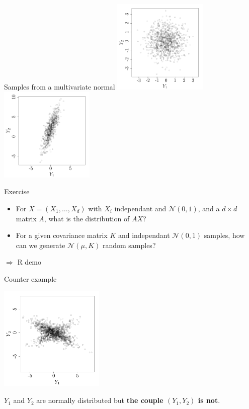 \begin{frame}{}
\begin{exampleblock}{Samples from a multivariate normal}
 \includegraphics[height=4.5cm]{1_stat_models/figures/R/MVN_gaussvec2} \qquad \qquad \includegraphics[height=4.5cm]{1_stat_models/figures/R/MVN_gaussvec1}
\end{exampleblock}
\vspace{-5mm}
\begin{exampleblock}{Exercise}
\begin{itemize}
  \item For $X=(X_1,\dots,X_d)$ with $X_i$ independant and $\mathcal{N}(0,1)$, and a $d \times d$ matrix $A$, what is the distribution of $AX$?
  \item For a given covariance matrix $K$ and independant $\mathcal{N}(0,1)$ samples, how can we generate $\mathcal{N}(\mu,K)$ random samples?
\end{itemize}
\end{exampleblock}
\alert{$\Rightarrow$ R demo}
\end{frame}

\begin{frame}{}
\begin{exampleblock}{Counter example}
\begin{center}
 \includegraphics[height=5cm]{1_stat_models/figures/R/MVN_gaussvec3}
\end{center}
$Y_1$ and $Y_2$ are normally distributed but \textbf{the couple $(Y_1,Y_2)$ is not}.
\end{exampleblock}
\end{frame}


